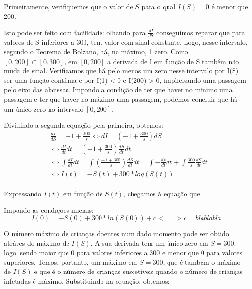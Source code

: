 \documentclass[portuguese, a4paper]{article}
\begin{document}
	\subsection{}
		\subsubsection{}
		\par %
		Primeiramente, verifiquemos que o valor de $S$ para o qual $I(S) = 0$ é menor que 200.
		\par
		Isto pode ser feito com facilidade: olhando para $\frac{dI}{dS}$ conseguímos reparar que para valores
		de S inferiores a 300, tem valor com sinal constante. Logo, nesse intervalo, segundo o Teorema de Bolzano,
		há, no máximo, 1 zero. Como $[0, 200] \subset [0, 300]$, em $[0, 200]$ a derivada de I em função de S também não muda de sinal.
		Verificamos que há pelo menos um zero nesse intervalo por I(S) ser uma função contínua e por I(1) < 0 e I(200) > 0, 
		implicitando uma passagem pelo eixo das abcissas. Impondo a condição de ter que haver no mínimo uma passagem e ter que haver no máximo uma passagem, 
		podemos concluir que há um único zero no intervalo $[0, 200]$.
		\par
		Dividindo a segunda equação pela primeira, obtemos:
		\begin{equation} \label{di}
		\begin{split}
			& \frac{dI}{dS} = -1 + \frac{300}{s}
			\Leftrightarrow dI = \left(-1 + \frac{300}{s}\right)dS   \\ 
			& \Leftrightarrow \frac{dI}{dt} dt = \left( -1 + \frac{300}{s}\right) \frac{dS}{dt} dt \\ 
			& \Leftrightarrow \int\frac{dI}{dt}dt = \int\left(\frac{-1 + 300}{s}\right)\frac{dS}{dt}dt =
			\int - \frac{ds}{dt}dt + \int\frac{300}{s}\frac{dS}{dt}dt \\
			& \Leftrightarrow I(t) = -S(t) + 300*log(S(t)) \\
		\end{split}
		\end{equation}

		Expressando $I(t)$ em função de $S(t)$, chegamos à equação que

		Impondo as condições iniciais:
		$$I(0) = -S(0) + 300* ln(S(0)) + c <=> c = bla bla bla$$


		O número máximo de crianças doentes num dado momento pode ser obtido
		atráves do máximo de $I(S)$. A sua derivada tem um único zero em $S = 300$,
		logo, sendo maior que 0 para valores inferiores a 300 e menor que 0 para valores superiores.
		Temos, portanto, um máximo em $S = 300$, que é também o máximo de $I(S)$ e que é
		o número de crianças suscetíveis quando o número de crianças infetadas é máximo.
		Substituindo na equação, obtemos:
\end{document}
